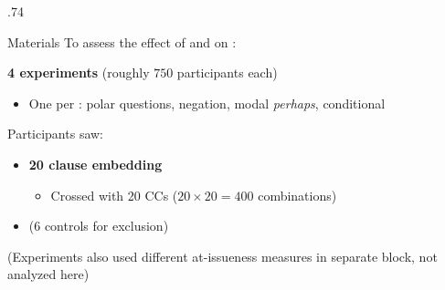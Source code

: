 \documentclass[final, table]{beamer}
\newlength{\sepwidth}
\newlength{\colwidth}
\newlength{\vboxsep}
\newcommand{\separatorcolumn}{\begin{column}{\sepwidth}\end{column}}
\begin{document}
\begin{frame}[t]
\begin{columns}[t]
\begin{column}{.74\colwidth}
			\vspace{\vboxsep}
			\begin{normalbox}{Materials}
				To assess the effect of  and  on :
				\vspace{.2\baselineskip}

					\textbf{4 experiments} (roughly $750$ participants each)
					\vspace{-.3\baselineskip}
					\begin{itemize}
						\item One per : polar questions, negation, modal \textit{perhaps}, conditional
					\end{itemize}

					\vspace{-.2\baselineskip}
					Participants saw:
					\vspace{-.3\baselineskip}
					\begin{itemize}
						\item \textbf{20 clause embedding }

						\begin{itemize}
							\item  Crossed with 20 CCs ($20 \times 20 = 400$ combinations)
						\end{itemize}

						\item (6 controls for exclusion)

					\end{itemize}
				\vspace{-.2\baselineskip}
				{\small (Experiments also used different at-issueness measures in separate block, not analyzed here)}

			\end{normalbox}
			
		\end{column}

		\separatorcolumn
		

\end{columns}
\end{frame}
\end{document}
